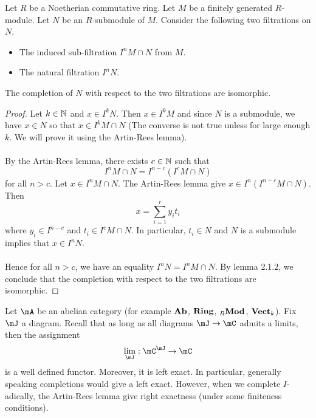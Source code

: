 \documentclass[a4paper]{article}
\begin{document}
\begin{prp}{}{}Let $R$ be a Noetherian commutative ring. Let $M$ be a finitely generated $R$-module. Let $N$ be an $R$-submodule of $M$. Consider the following two filtrations on $N$. 
\begin{itemize}
\item The induced sub-filtration $I^nM\cap N$ from $M$. 
\item The natural filtration $I^nN$. 
\end{itemize}
The completion of $N$ with respect to the two filtrations are isomorphic. 
\begin{proof}
Let $k\in\mathbb{N}$ and $x\in I^kN$. Then $x\in I^kM$ and since $N$ is a submodule, we have $x\in N$ so that $x\in I^kM\cap N$ (The converse is not true unless for large enough $k$. We will prove it using the Artin-Rees lemma). \\~\\

By the Artin-Rees lemma, there exists $c\in\mathbb{N}$ such that $$I^nM\cap N=I^{n-c}(I^cM\cap N)$$ for all $n>c$. Let $x\in I^nM\cap N$. The Artin-Rees lemma give $x\in I^n(I^{n-c}M\cap N)$. Then $$x=\sum_{i=1}^ry_it_i$$ where $y_i\in I^{n-c}$ and $t_i\in I^cM\cap N$. In particular, $t_i\in N$ and $N$ is a submodule implies that $x\in I^nN$. \\~\\

Hence for all $n>c$, we have an equality $I^nN=I^nM\cap N$. By lemma 2.1.2, we conclude that the completion with respect to the two filtrations are isomorphic. 
\end{proof}
\end{prp}

Let $\mA$ be an abelian category (for example $\bold{Ab}$, $\bold{Ring}$, ${_R\bold{Mod}}$, $\bold{Vect}_k$). Fix $\mJ$ a diagram. Recall that as long as all diagrams $\mJ\to\mC$ admits a limits, then the assignment $$\lim_\mJ:\mC^\mJ\to\mC$$ is a well defined functor. Moreover, it is left exact. In particular, generally speaking completions would give a left exact. However, when we complete $I$-adically, the Artin-Rees lemma give right exactness (under some finiteness conditions). 
\end{document}
